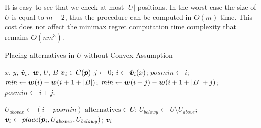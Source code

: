 It is easy to see that we check at most $|U|$ positions. In the worst case the size of $U$ is equal to $m-2$, thus the procedure can be computed in $O(m)$ time. This cost does not affect the minimax regret computation time complexity that remains $O(nm^3)$.

\begin{algorithm}[h] 
	\caption{Placing alternatives in $U$ without Convex Assumption}
	\label{alg:splittingU} 
	\begin{algorithmic}
		\Require $x$, $y$, $\hat{\bm{v}}_i$, $\bm{w}$, $U$, $B$
		\Ensure $\bm{v}_i \in C({\bm{p}})$
		\Statex
		\State $ j \gets 0$;
		\State $ i \gets \hat{\bm{v}}_i(x)$;
		\State $ \mathit{posmin} \gets i$;
		\State $ \mathit{min} \gets \bm{w}(i) - \bm{w}(i+1+|B|)$;
		\State $ \mathit{min} \gets \bm{w}(i+j) - \bm{w}(i+1+|B|+j)$;
		\State $ \mathit{posmin} \gets i+j$;
		\EndIf
		\EndWhile
		
		\State $U_{\mathit{abovex}} \gets (i-\mathit{posmin}) \text{ alternatives} \in U $;
		\State $U_{\mathit{belowy}} \gets U \setminus U_{\mathit{above}}$;
		\Statex
		\State $\bm{v}_i \gets place({\bm{p}}_i,U_{\mathit{abovex}},U_{\mathit{belowy}})$;
		\Statex \Return $\bm{v}_i$
		
	\end{algorithmic}
\end{algorithm}

% 
% 
% 
%
%
%

